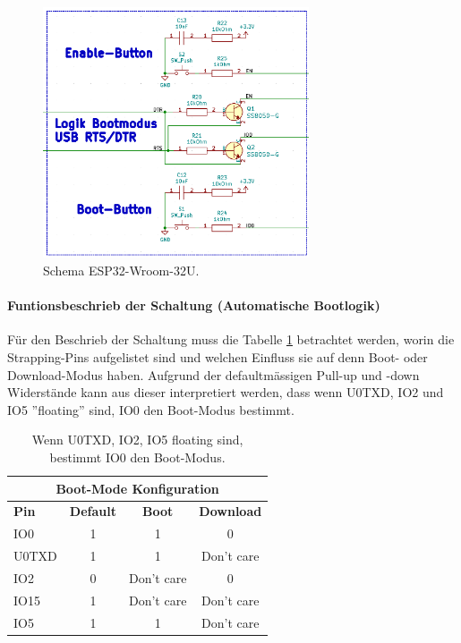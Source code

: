 \begin{figure}[h!]
	\centering
	\includegraphics[width=0.7\textwidth]{graphics/Schema_ESP32_Flashbuttons}
	\caption{Schema ESP32-Wroom-32U.}
	\label{fig:Schema_ESP32_Flashbuttons}
\end{figure}

\newpage

\paragraph{Funtionsbeschrieb der Schaltung (Automatische Bootlogik)}\mbox{}

Für den Beschrieb der Schaltung muss die Tabelle \ref{tab:Einfluss_Pins_auf_Boot_Modus} betrachtet werden, worin die Strapping-Pins aufgelistet sind und welchen Einfluss sie auf denn Boot- oder Download-Modus haben. Aufgrund der defaultmässigen Pull-up und -down Widerstände kann aus dieser interpretiert werden, dass wenn U0TXD, IO2 und IO5 ''floating'' sind, IO0 den Boot-Modus bestimmt.

\begin{table}[h!]
\center
\begin{tabular}{|l|c|c|c|}
\hline
\multicolumn{4}{|c|}{\textbf{Boot-Mode Konfiguration}}\\
\hline
\textbf{Pin} & \textbf{Default} & \textbf{Boot} & \textbf{Download} \\
\hline
IO0 & 1 & 1 & 0 \\
\hline
U0TXD & 1 & 1 & Don't care \\
\hline
IO2 & 0 & Don't care & 0 \\
\hline
IO15 & 1 & Don't care & Don't care \\
\hline
IO5 & 1 & 1 & Don't care \\
\hline
\end{tabular}
\caption{Wenn U0TXD, IO2, IO5 floating sind, bestimmt IO0 den Boot-Modus.}
\label{tab:Einfluss_Pins_auf_Boot_Modus}
\end{table}

